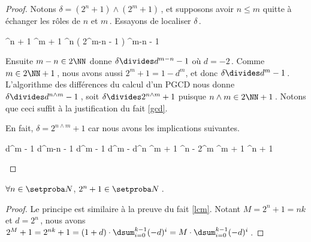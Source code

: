 \begin{proof}
	Notons $\delta = (2^n + 1) \wedge (2^m + 1)$\,, et supposons avoir $n \leq m$ quitte à échanger les rôles de $n$ et $m$\,.
	Essayons de localiser $\delta$\,.
		
	\medskip
	\begin{stepcalc}[style = ar*, ope = \implies]
		\delta {}^n + 1  \delta {}^m + 1
		\delta {}^n \big( 2^{m-n} - 1 \big)
		\delta {}^{m-n} - 1
	\end{stepcalc}
	
	\medskip
	
	Ensuite $m - n \in 2 \NN$ donne $\delta \divides d^{m-n} - 1$ où $d = -2$\,.
	Comme $m \in 2 \NN + 1$\,, nous avons aussi $2^m + 1 = 1 - d^m$, et donc $\delta \divides d^m - 1$\,. 
	L'algorithme des différences du calcul d'un PGCD nous donne $\delta \divides d^{n \wedge m} - 1$\,, soit $\delta \divides 2^{n \wedge m} + 1$ puisque $n \wedge m \in 2 \NN + 1$\,.
	Notons que ceci suffit à la justification du fait \ref{gcd}.
	
	\medskip
	
	En fait, $\delta = 2^{n \wedge m} + 1$ car nous avons les implications suivantes.
		
	\medskip
	\begin{stepcalc}[style = ar*, ope = \implies]
		\delta \divides d^m - 1  \delta \divides d^{m-n} - 1
	\explnext{}
		\delta \divides d^m - 1  \delta \divides d^m - d^n
		\delta {}^m + 1  \delta {}^n - 2^m
		\delta {}^m + 1  \delta {}^n + 1
	\end{stepcalc}
\end{proof}




\begin{fact}
	$\forall n \in \ourset$, $2^n + 1 \in \ourset$\,.
\end{fact}

\begin{proof}
	Le principe est similaire à la preuve du fait \ref{lcm}.
	Notant $M = 2^n + 1 = n k$ et $d = 2^n$\,, nous avons
	$2^M + 1 = 2^{nk} + 1 = (1 + d) \cdot \dsum_{i=0}^{k-1} (-d)^i = M \cdot \dsum_{i=0}^{k-1} (-d)^i$\,.
\end{proof}

